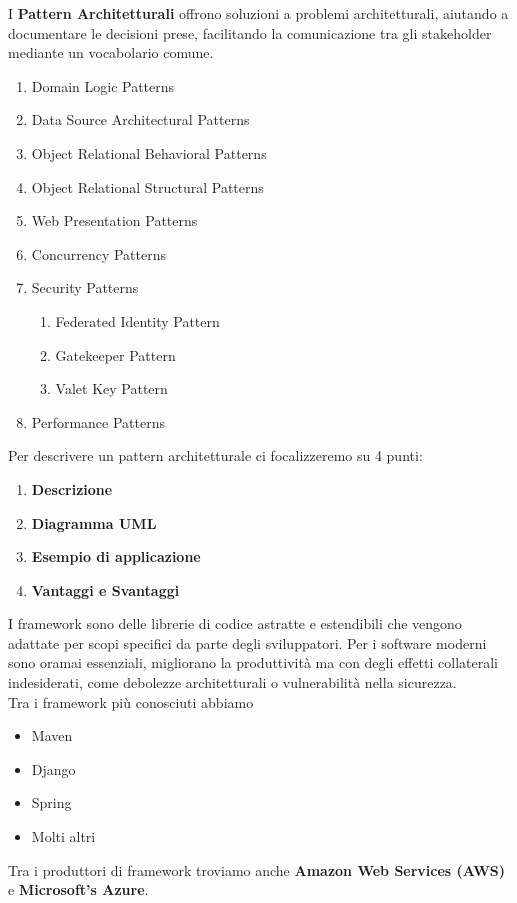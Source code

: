 {    \begin{tcolorbox}[colback=green!5!white, colframe=green!75!black]
        I \textbf{Pattern Architetturali} offrono soluzioni a problemi architetturali, aiutando a documentare le decisioni prese,
        facilitando la comunicazione tra gli stakeholder mediante un vocabolario comune.
    \end{tcolorbox}
    \newpage
    \begin{enumerate}
        \item Domain Logic Patterns
        \item Data Source Architectural Patterns
        \item Object Relational Behavioral Patterns
        \item Object Relational Structural Patterns
        \item Web Presentation Patterns
        \item Concurrency Patterns
        \item Security Patterns
              \begin{enumerate}
                \renewcommand{\labelenumii}{\theenumi.\arabic{enumii}}
                \setcounter{enumii}{0}
                  \item Federated Identity Pattern
                  \item Gatekeeper Pattern
                  \item Valet Key Pattern
              \end{enumerate}
        \item Performance Patterns
    \end{enumerate}
    Per descrivere un pattern architetturale ci focalizzeremo su 4 punti:
    \begin{enumerate}
        \item \textbf{Descrizione}
        \item \textbf{Diagramma UML}
        \item \textbf{Esempio di applicazione}
        \item \textbf{Vantaggi e Svantaggi}
    \end{enumerate}
    I framework sono delle librerie di codice astratte e estendibili che vengono adattate per scopi specifici da parte
    degli sviluppatori. Per i software moderni sono oramai essenziali, migliorano la produttività ma con degli effetti
    collaterali indesiderati, come debolezze architetturali o vulnerabilità nella sicurezza.
    \\
    Tra i framework più conosciuti abbiamo
    \begin{itemize}
        \item Maven
        \item Django
        \item Spring
        \item Molti altri
    \end{itemize}

    Tra i produttori di framework troviamo anche \textbf{Amazon Web Services (AWS)} e \textbf{Microsoft's Azure}.
    
    \newpage
}